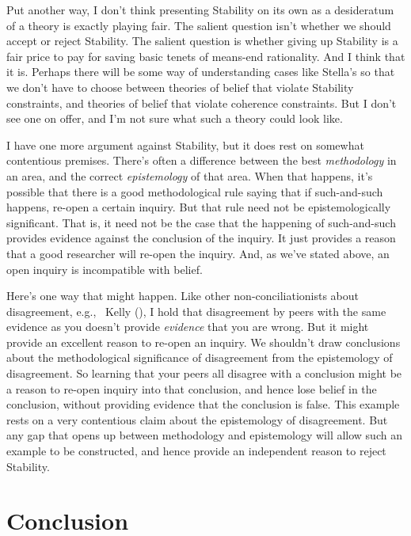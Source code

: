 \documentclass[
  10pt,
  letterpaper,
  DIV=11,
  numbers=noendperiod,
  twoside]{scrartcl}
\begin{document}
Put another way, I don't think presenting Stability on its own as a
desideratum of a theory is exactly playing fair. The salient question
isn't whether we should accept or reject Stability. The salient question
is whether giving up Stability is a fair price to pay for saving basic
tenets of means-end rationality. And I think that it is. Perhaps there
will be some way of understanding cases like Stella's so that we don't
have to choose between theories of belief that violate Stability
constraints, and theories of belief that violate coherence constraints.
But I don't see one on offer, and I'm not sure what such a theory could
look like.

I have one more argument against Stability, but it does rest on somewhat
contentious premises. There's often a difference between the best
\emph{methodology} in an area, and the correct \emph{epistemology} of
that area. When that happens, it's possible that there is a good
methodological rule saying that if such-and-such happens, re-open a
certain inquiry. But that rule need not be epistemologically
significant. That is, it need not be the case that the happening of
such-and-such provides evidence against the conclusion of the inquiry.
It just provides a reason that a good researcher will re-open the
inquiry. And, as we've stated above, an open inquiry is incompatible
with belief.

Here's one way that might happen. Like other non-conciliationists about
disagreement, e.g., ~Kelly (), I
hold that disagreement by peers with the same evidence as you doesn't
provide \emph{evidence} that you are wrong. But it might provide an
excellent reason to re-open an inquiry. We shouldn't draw conclusions
about the methodological significance of disagreement from the
epistemology of disagreement. So learning that your peers all disagree
with a conclusion might be a reason to re-open inquiry into that
conclusion, and hence lose belief in the conclusion, without providing
evidence that the conclusion is false. This example rests on a very
contentious claim about the epistemology of disagreement. But any gap
that opens up between methodology and epistemology will allow such an
example to be constructed, and hence provide an independent reason to
reject Stability.

\section{Conclusion}\label{conclusion}
\end{document}
